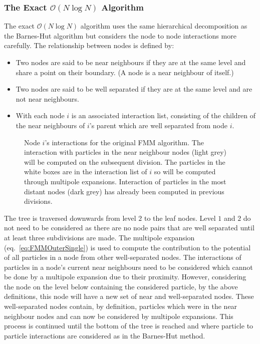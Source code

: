\subsubsection{\texorpdfstring{The Exact $\mathcal{O}(N\log N)$ Algorithm}{The Exact O(N log N) Algorithm}} \label{subsec:ExactNlogN}
The exact $\mathcal{O}(N\log N)$ algorithm uses the same hierarchical decomposition as the Barnes-Hut algorithm but considers the node to node interactions more carefully. The relationship between nodes is defined by:
\begin{itemize}
    \item Two nodes are said to be near neighbours if they are at the same level and share a point on their boundary. (A node is a near neighbour of itself.)
    \item Two nodes are said to be well separated if they are at the same level and are not near neighbours.
    \item With each node $i$ is an associated interaction list, consisting of the children of the near neighbours of $i$’s parent which are well separated from node $i$.
\end{itemize}

\begin{figure}
    \centering
        \resizebox{.4\linewidth}{!}{}
    \caption[Node $i$'s interactions for the original FMM algorithm.]{Node $i$'s interactions for the original FMM algorithm. The interaction with particles in the near neighbour nodes (light grey) will be computed on the subsequent division. The particles in the white boxes are in the interaction list of $i$ so will be computed through multipole expansions. Interaction of particles in the most distant nodes (dark grey) has already been computed in previous divisions.}
    \label{fig:FMMDecomp}
\end{figure}

The tree is traversed downwards from level $2$ to the leaf nodes. Level $1$ and $2$ do not need to be considered as there are no node pairs that are well separated until at least three subdivisions are made. The multipole expansion (eq.~\ref{eq:FMMOuterSingle}) is used to compute the contribution to the potential of all particles in a node from other well-separated nodes. The interactions of particles in a node's current near neighbours need to be considered which cannot be done by a multipole expansion due to their proximity. However, considering the node on the level below containing the considered particle, by the above definitions, this node will have a new set of near and well-separated nodes. These well-separated nodes contain, by definition, particles which were in the near neighbour nodes and can now be considered by multipole expansions. This process is continued until the bottom of the tree is reached and where particle to particle interactions are considered as in the Barnes-Hut method. 

